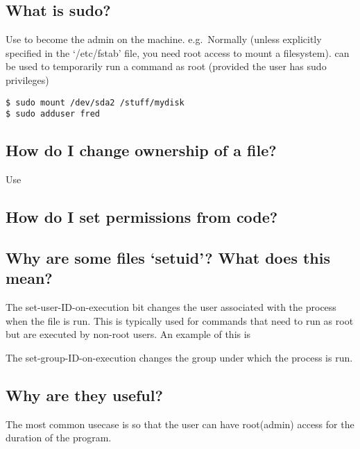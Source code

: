 \subsection{What is sudo?}\label{what-is-sudo}

Use  to become the admin on the machine. e.g.~Normally (unless explicitly specified in the `/etc/fstab' file, you need root access to mount a filesystem).  can be used to temporarily run a command as root (provided the user has sudo privileges)

\begin{lstlisting}
$ sudo mount /dev/sda2 /stuff/mydisk
$ sudo adduser fred
\end{lstlisting}

\subsection{How do I change ownership of a file?}\label{how-do-i-change-ownership-of-a-file}

Use 

\subsection{How do I set permissions from code?}\label{how-do-i-set-permissions-from-code}


\subsection{\texorpdfstring{Why are some files `setuid'? What does this mean?}{Why are some files setuid? What does this mean?}}\label{why-are-some-files-setuid-what-does-this-mean}

The set-user-ID-on-execution bit changes the user associated with the process when the file is run. This is typically used for commands that need to run as root but are executed by non-root users. An example of this is 

The set-group-ID-on-execution changes the group under which the process is run.

\subsection{Why are they useful?}\label{why-are-they-useful}

The most common usecase is so that the user can have root(admin) access for the duration of the program.

